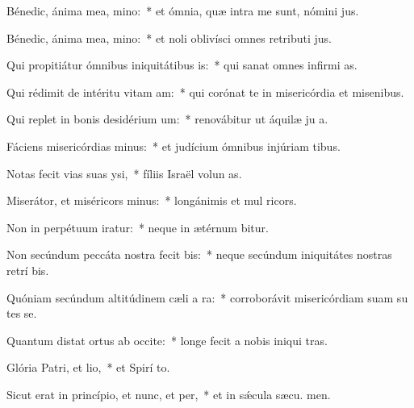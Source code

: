 \item Bénedic, ánima mea, mino:~* et ómnia, quæ intra me sunt, nómini  jus.
\item Bénedic, ánima mea, mino:~* et noli oblivísci omnes retributi jus.
\item Qui propitiátur ómnibus iniquitátibus is:~* qui sanat omnes infirmi as.
\item Qui rédimit de intéritu vitam am:~* qui corónat te in misericórdia et misenibus.
\item Qui replet in bonis desidérium um:~* renovábitur ut áquilæ ju a.
\item Fáciens misericórdias minus:~* et judícium ómnibus injúriam tibus.
\item Notas fecit vias suas ysi,~* fíliis Israël volun as.
\item Miserátor, et miséricors minus:~* longánimis et mul ricors.
\item Non in perpétuum iratur:~* neque in ætérnum bitur.
\item Non secúndum peccáta nostra fecit bis:~* neque secúndum iniquitátes nostras retrí bis.
\item Quóniam secúndum altitúdinem cæli a ra:~* corroborávit misericórdiam suam su tes se.
\item Quantum distat ortus ab occite:~* longe fecit a nobis iniqui tras.
\item Glória Patri, et lio,~* et Spirí to.
\item Sicut erat in princípio, et nunc, et per,~* et in sǽcula sæcu. men.
